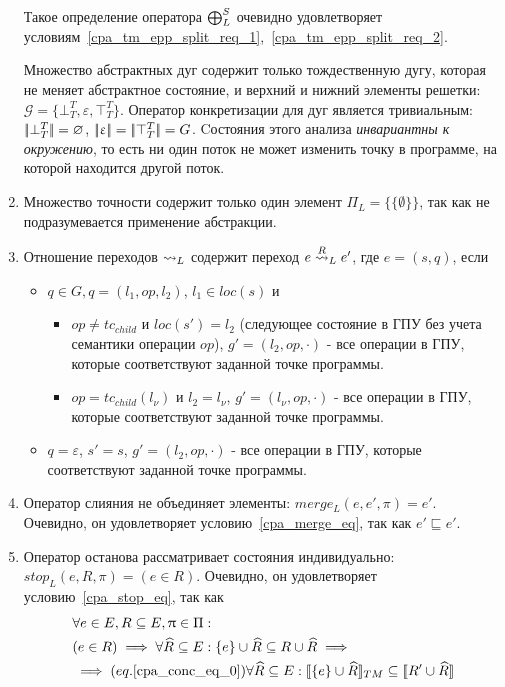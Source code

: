 \begin{enumerate}
Такое определение оператора $\mathrel{\bigoplus}^S_{L}$ очевидно удовлетворяет условиям~\ref{cpa_tm_epp_split_req_1},~\ref{cpa_tm_epp_split_req_2}.

Множество абстрактных дуг содержит только тождественную дугу, которая не меняет абстрактное состояние, и верхний и нижний элементы решетки: $\mathcal{G} = \{\bot^T_T, \varepsilon, \top^T_T\}$.
Оператор конкретизации для дуг является тривиальным: $\lvert \! \lvert \bot^T_T \rvert \! \rvert = \varnothing$, $\lvert \! \lvert \upvarepsilon \rvert \! \rvert = \lvert \! \lvert \top^T_T \rvert \! \rvert = G$.
Cостояния этого анализа {\em инвариантны к окружению}, то есть ни один поток не может изменить точку в программе, на которой находится другой поток.

\item Множество точности содержит только один элемент $\Pi_L = \{\{\emptyset\}\}$, так как не подразумевается применение абстракции.

\item Отношение переходов $\leadsto_L$ содержит переход $e \stackrel{R}{\leadsto}_L e'$, где $e = (s, q)$, если 
\begin{itemize}
\item $q \in G, q=(l_1,op,l_2)$, $l_1 \in loc(s)$ и
\begin{itemize}
\item $op \neq tc_{child}$ и $loc(s') = l_2$ (следующее состояние в ГПУ без учета семантики операции $op$), $g' = (l_2, op, \cdot)$ - все операции в ГПУ, которые соответствуют заданной точке программы.
\item $op=tc_{child}(l_\nu)$ и $l_2 = l_\nu$, $g' = (l_\nu, op, \cdot)$ - все операции в ГПУ, которые соответствуют заданной точке программы.
\end{itemize}
\item $q = \varepsilon$, $s'=s$, $g' = (l_2, op, \cdot)$ - все операции в ГПУ, которые соответствуют заданной точке программы.
\end{itemize}


\item Оператор слияния не объединяет элементы: $merge_L(e, e', \pi) = e'$. Очевидно, он удовлетворяет условию~\ref{cpa_merge_eq}, так как $e' \sqsubseteq e'$.

\item Оператор останова рассматривает состояния индивидуально: $stop_L(e, R, \pi) = (e \in R)$. Очевидно, он удовлетворяет условию~\ref{cpa_stop_eq}, так как
\begin{align}
&\forall e \in E, R \subseteq E, \uppi \in \Pi: \nonumber \\
& (e \in R) \implies \forall \widehat{R} \subseteq E: \{e\} \cup \widehat{R} \subseteq R \cup \widehat{R} \implies \nonumber \\
& \implies (eq.\ref{cpa_conc_eq_0}) \forall \widehat{R} \subseteq E: [\![ \{e\}\cup \widehat{R} ]\!]_{TM} \subseteq [\![ R' \cup \widehat{R} ]\!]
\end{align}


\end{enumerate}
